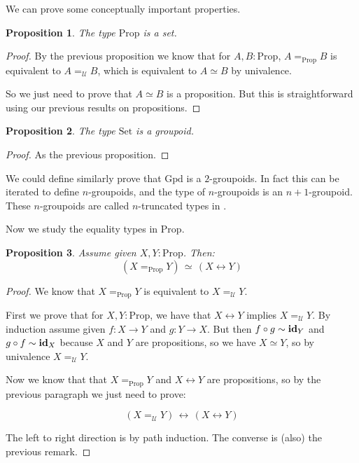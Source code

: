 \documentclass{article}
\newcommand{\U}{{\mathcal U}}
\renewcommand{\r}{\rightarrow}
\newcommand{\id}{\mathrm{\bf id}}
\newcommand{\Set}{\mathrm{Set}}
\newcommand{\Prop}{\mathrm{Prop}}
\newcommand{\Gpd}{\mathrm{Gpd}}
\newtheorem{proposition}{Proposition}
\begin{document}

We can prove some conceptually important properties.

\begin{proposition}
The type $\Prop$ is a set.
\end{proposition}
\begin{proof}
By the previous proposition we know that for $A,B:\Prop$, $A=_\Prop B$ is equivalent to $A=_\U B$, which is equivalent to $A\simeq B$ by univalence.

So we just need to prove that $A\simeq B$ is a proposition. But this is straightforward using our previous results on propositions. %
\end{proof}

\begin{proposition}
The type $\Set$ is a groupoid.
\end{proposition}

\begin{proof}
As the previous proposition.
\end{proof}

We could define similarly prove that $\Gpd$ is a $2$-groupoids. In fact this can be iterated to define $n$-groupoids, and the type of $n$-groupoids is an $n+1$-groupoid. These $n$-groupoids are called $n$-truncated types in \cite{hottbook}.


Now we study the equality types in $\Prop$. %

\begin{proposition}
Assume given $X,Y:\Prop$. Then:
\[(X=_\Prop Y)\, \simeq \, (X\leftrightarrow Y)\]
\end{proposition}
\begin{proof}
We know that $X=_\Prop Y$ is equivalent to $X=_\U Y$. 

First we prove that for $X,Y:\Prop$, we have that $X\leftrightarrow Y$ implies $X=_\U Y$. By induction assume given $f:X\r Y$ and $g: Y\r X$. But then $f\circ g \sim \id_Y$ and $g\circ f\sim \id_X$ because $X$ and $Y$ are propositions, so we have $X\simeq Y$, so by univalence $X=_\U Y$.

Now we know that that $X=_\Prop Y$ and $X\leftrightarrow Y$ are propositions, so by the previous paragraph we just need to prove:

\[(X=_\U Y)\, \leftrightarrow \, (X\leftrightarrow Y)\]

The left to right direction is by path induction. The converse is (also) the previous remark.
\end{proof}
\end{document}

